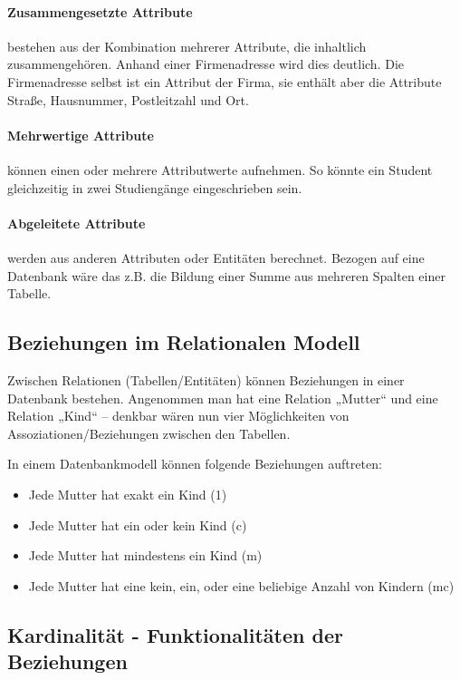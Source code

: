  \paragraph{Zusammengesetzte Attribute} bestehen aus der Kombination mehrerer Attribute, die inhaltlich zusammengehören. Anhand einer Firmenadresse wird dies deutlich. Die Firmenadresse selbst ist ein Attribut der Firma, sie enthält aber die Attribute Straße, Hausnummer, Postleitzahl und Ort.

 \paragraph{Mehrwertige Attribute} können einen oder mehrere Attributwerte aufnehmen. So könnte ein Student gleichzeitig in zwei Studiengänge eingeschrieben sein.

 \paragraph{Abgeleitete Attribute} werden aus anderen Attributen oder Entitäten berechnet. Bezogen auf eine Datenbank wäre das z.B. die Bildung einer Summe aus mehreren Spalten einer Tabelle.

 \subsection{Beziehungen im Relationalen Modell}

 Zwischen Relationen (Tabellen/Entitäten) können Beziehungen in einer Datenbank bestehen. Angenommen man hat eine Relation „Mutter“ und eine Relation „Kind“ – denkbar wären nun vier Möglichkeiten von Assoziationen/Beziehungen zwischen den Tabellen.

 In einem Datenbankmodell können folgende Beziehungen auftreten:

 \begin{itemize}
     \item Jede Mutter hat exakt ein Kind (1)
     \item Jede Mutter hat ein oder kein Kind (c)
     \item Jede Mutter hat mindestens ein Kind (m)
     \item Jede Mutter hat eine kein, ein, oder eine beliebige Anzahl von Kindern (mc)
 \end{itemize}

 \subsection{Kardinalität - Funktionalitäten der Beziehungen}

